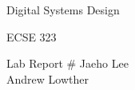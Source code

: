 \documentclass[12pt,letterpaper,titlepage]{article}
\begin{document}
\begin{titlepage}
	\centering
	{\LARGE Digital Systems Design \par}
	{\LARGE ECSE 323 \par}
	\vspace{.5cm}
	{\LARGE Lab Report \#}
	\vfill
	Jaeho Lee \\
	Andrew Lowther \\
\end{titlepage}
\end{document}
